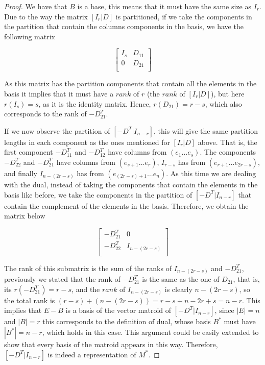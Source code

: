 \begin{proof}
    We have that $B$ is a base, this means that it must have the same size as $I_r$. Due to the way the matrix $[I_r|D]$ is partitioned, if we take the components in the partition that contain the columns components in the basis, we have the following matrix
    \begin{figure}[H]
        \centering
        $$\begin{bmatrix}
        I_s & D_{11}\\
        0 & D_{21}\\
        \end{bmatrix}$$
    \end{figure}
    As this matrix has the partition components that contain all the elements in the basis it implies that it must have a $rank$ of $r$ (the $rank$ of $[I_r|D]$), but here $r(I_s) = s$, as it is the identity matrix. Hence, $r(D_{21})=r-s$, which also corresponds to the rank of $-D_21^T$.
    
    If we now observe the partition of $[-D^T|I_{n-r}]$, this will give the same partition lengths in each component as the ones mentioned for $[I_r|D]$ above. That is, the first component $-D_{11}^T$ and $-D_{12}^T$ have columns from $(e_1 \dots e_s)$. The components $-D_{22}^T$ and $-D_{21}^T$ have columns from $(e_{s+1} \dots e_r)$, $I_{r-s}$ has from $(e_{r+1} \dots e_{2r-s})$, and finally $ I_{n-(2r-s)}$ has from $(e_{(2r-s)+1} \dots e_n)$.
    As this time we are dealing with the dual, instead of taking the components that contain the elements in the basis like before, we take the components in the partition of $[-D^T|I_{n-r}]$ that contain the complement of the elements in the basis. Therefore, we obtain the matrix below
    \begin{figure}[H]
        \centering
        $$\begin{bmatrix}
        -D_{21}^T & 0\\
        -D_{22}^T & I_{n-(2r-s)}\\
        \end{bmatrix}$$
    \end{figure}
   The rank of this submatrix is the sum of the ranks of $I_{n-(2r-s)}$ and $-D_{21}^T$, previously we stated that the rank of $-D_{21}^T$ is the same as the one of $D_{21}$, that is, its $r(-D_{21}^T)= r-s$, and the $rank$ of $I_{n-(2r-s)}$ is clearly $n-(2r-s)$, so the total rank is $(r-s)+(n-(2r-s))= r-s+n-2r+s = n-r$. This implies that $E-B$ is a basis of the vector matroid of $[-D^T|I_{n-r}]$, since $|E|= n$ and $|B|= r$ this corresponds to the definition of dual, whose basis $B^*$ must have $|B^*|= n-r$, which holds in this case. This argument could be easily extended to show that every basis of the matroid appears in this way. Therefore, $[-D^T|I_{n-r}]$ is indeed a representation of $M^*$.
\end{proof}

